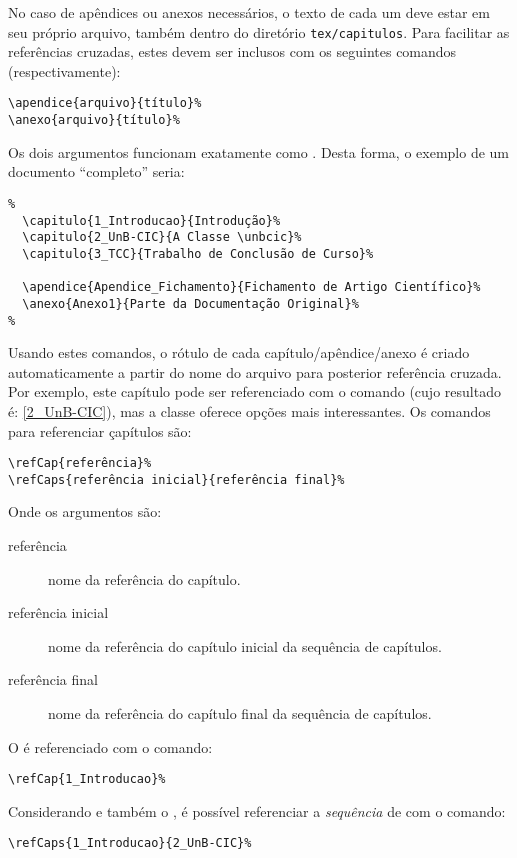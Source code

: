No caso de apêndices ou anexos necessários, o texto de cada um deve estar em seu
próprio arquivo, também dentro do diretório \texttt{tex/capitulos}. Para facilitar
as referências cruzadas, estes devem ser inclusos com os seguintes comandos
(respectivamente):
\begin{verbatim}
\apendice{arquivo}{título}%
\anexo{arquivo}{título}%
\end{verbatim}

Os dois argumentos funcionam exatamente como . Desta forma,
o exemplo de um documento ``completo'' seria: %

\begin{verbatim}
%
  \capitulo{1_Introducao}{Introdução}%
  \capitulo{2_UnB-CIC}{A Classe \unbcic}%
  \capitulo{3_TCC}{Trabalho de Conclusão de Curso}%

  \apendice{Apendice_Fichamento}{Fichamento de Artigo Científico}%
  \anexo{Anexo1}{Parte da Documentação Original}%
%
\end{verbatim}

Usando estes comandos, o rótulo de cada capítulo/apêndice/anexo é criado
automaticamente a partir do nome do arquivo para posterior referência cruzada.
Por exemplo, este capítulo pode ser referenciado com o comando
 (cujo resultado é: \ref{2_UnB-CIC}), mas a classe
oferece opções mais interessantes. Os comandos para referenciar çapítulos são:

\begin{verbatim}
\refCap{referência}%
\refCaps{referência inicial}{referência final}%
\end{verbatim}

Onde os argumentos são:
\begin{description}
\item[referência] nome da referência do capítulo.
\item[referência inicial] nome da referência do capítulo inicial da sequência de capítulos.
\item[referência final] nome da referência do capítulo final da sequência de capítulos.
\end{description}

O  é referenciado com o comando:
\begin{verbatim}
\refCap{1_Introducao}%
\end{verbatim}

Considerando   e também o , é possível referenciar
a \emph{sequência} de  com o comando:
\begin{verbatim}
\refCaps{1_Introducao}{2_UnB-CIC}%
\end{verbatim}

